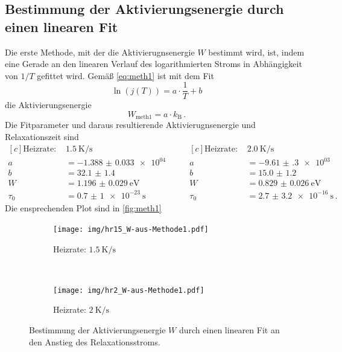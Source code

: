 \subsection{Bestimmung der Aktivierungsenergie durch einen linearen Fit}

Die erste Methode, mit der die Aktivierugnsenergie $W$ bestimmt wird, ist, indem eine Gerade an den linearen Verlauf des logarithmierten Stroms in Abhängigkeit von $1/T$ gefittet wird. Gemäß \autoref{eq:meth1} ist mit dem Fit
\begin{equation}
  \ln{(j(T))} = a \cdot \frac{1}{T} + b
\end{equation}
die Aktivierungsenergie
\begin{equation*}
  W_\text{meth1} = a \cdot k_\text{B}\,.
\end{equation*}
Die Fitparameter und daraus resultierende Aktivierugnsenergie und Relaxationszeit sind
\begin{equation*}
\begin{aligned}[c]
  \text{Heizrate: }& \SI{1.5}{\kelvin\per\second}\\
  a &= \num{-1.388(33)e+04}\\
  b &= \num{32.1(14)}\\
  W &= \SI{1.196(29)}{\electronvolt}\\
  \tau_0 &= \SI{0.7(10)e-23}{\second}
\end{aligned}
\qquad
\begin{aligned}[c]
  \text{Heizrate: }& \SI{2.0}{\kelvin\per\second}\\
  a &= \num{-9.61(30)e+03}\\
  b &= \num{15.0(12)}\\
  W &= \SI{0.829(26)}{\electronvolt}\\
  \tau_0 &= \SI{2.7(32)e-16}{\second}\,.
\end{aligned}
\end{equation*}
Die ensprechenden Plot sind in \autoref{fig:meth1}
\begin{figure}[htp]
    \centering
    \begin{subfigure}[t]{0.5\textwidth}
        \centering
        \texttt{[image: img/hr15\_W-aus-Methode1.pdf]}
        \caption{Heizrate: $\SI{1.5}{\kelvin\per\second}$}
    \end{subfigure}%
    ~
    \begin{subfigure}[t]{0.5\textwidth}
        \centering
        \texttt{[image: img/hr2\_W-aus-Methode1.pdf]}
        \caption{Heizrate: $\SI{2}{\kelvin\per\second}$}
    \end{subfigure}
    \caption{Bestimmung der Aktivierungsenergie $W$ durch einen linearen Fit an den Anstieg des Relaxationsstroms.}
    \label{fig:meth1}
\end{figure}

